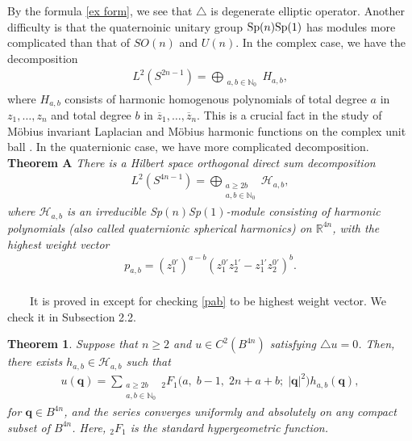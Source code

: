 \documentclass[a4paper,11pt]{amsart}
\numberwithin{equation}{section}
\newtheorem{thm}{Theorem}[section]
\begin{document}
By the formula \eqref{ex form}, we see that $\triangle$ is degenerate elliptic operator. Another difficulty is that the quaternoinic unitary group ${\rm Sp}(n){\rm Sp}(1)$ has modules more complicated than that of $SO(n)$ and $U(n)$. In the complex case, we have the decomposition
\begin{equation*}\begin{aligned}
L^2(S^{2n-1})=\mathop{\bigoplus}_{\substack{a,b\in \mathbb{N}_0}}H_{a,b},
\end{aligned}\end{equation*}
 where $H_{a,b}$ consists of harmonic homogenous polynomials of total degree $a$ in $z_1,\dots,z_n$ and total degree $b$ in $\overline{z}_1,\dots,\overline{z}_n$. This is a crucial fact in the study of M\"{o}bius invariant Laplacian and M\"{o}bius harmonic functions on the complex unit ball \cite{Rudin}. In the quaternionic case, we have more complicated decomposition.
\\[8pt]
\vspace{\parskip}
\textbf{Theorem\; A} \label{highest weight vector}\cite[Proposition 2.1]{Co}
{\it There is a Hilbert space orthogonal direct sum decomposition
\begin{equation}\begin{aligned}\label{L2 decomp}
L^2(S^{4n-1})=\mathop{\bigoplus}_{\substack{a\geq 2b\\a,b\in \mathbb{N}_0}}\mathcal{H}_{a,b},
\end{aligned}\end{equation}
where $\mathcal{H}_{a,b}$ is an irreducible {\rm Sp}$(n)${\rm Sp}$(1)$-module consisting of harmonic polynomials (also called quaternionic spherical harmonics) on $\mathbb{R}^{4n}$, with the highest weight vector
\begin{equation}\begin{aligned}\label{pab}
p_{a,b}=\left(z_1^{0'}\right)^{a-b}\left(z_1^{0'}z_2^{1'}-z_1^{1'}z_2^{0'}\right)^{b}.
\end{aligned}\end{equation}
}
\\[8pt]
\vspace{\parskip}
$\qquad$It is proved in \cite{Co,Zhang} except for checking \eqref{pab} to be highest weight vector. We check it in Subsection 2.2.

\begin{thm}\label{no boundary decomp}
Suppose that $n\geq2$ and $u\in C^2(B^{4n})$ satisfying $\triangle u=0$. Then, there exists $h_{a,b}\in \mathcal{H}_{a,b}$ such that
\begin{equation}\begin{aligned}\label{no boundary decomp eq}
u(\mathbf{q})=\sum_{\substack{a\geq 2b\\a,b\in \mathbb{N}_0}}{}_2F_1\bigl(a,\; b-1,\; 2n+a+b;\; |\mathbf{q}|^2\bigr)h_{a,b}(\mathbf{q}),
\end{aligned}\end{equation}
for $\mathbf{q}\in B^{4n}$, and the series converges uniformly and absolutely on any compact subset of $B^{4n}$. Here, ${}_2F_1$ is the standard hypergeometric function.
\end{thm}
\end{document}
